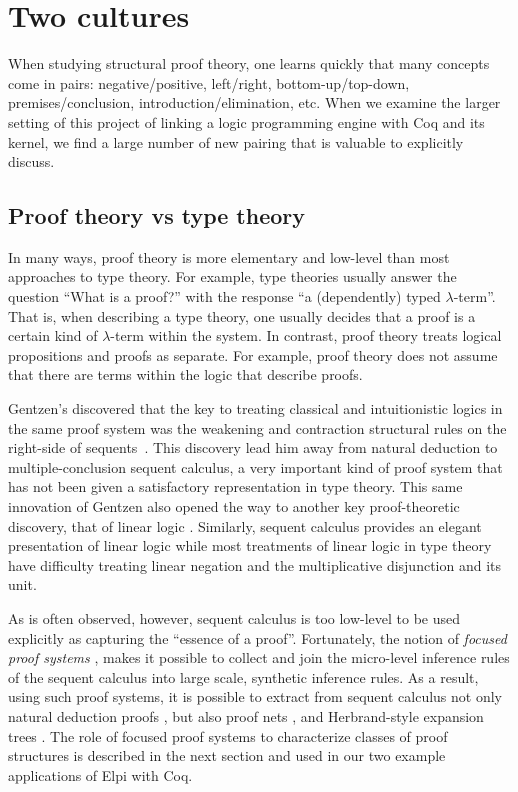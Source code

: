 \section{Two cultures}

When studying structural proof theory, one learns quickly that many
concepts come in pairs: negative/positive, left/right,
bottom-up/top-down, premises/conclusion, introduction/elimination,
etc.  When we examine the larger setting of this project of linking a
logic programming engine with Coq and its kernel, we find a large
number of new pairing that is valuable to explicitly discuss.

\subsection{Proof theory vs type theory}

In many ways, proof theory is more elementary and low-level than most
approaches to type theory.  For example, type theories usually answer
the question ``What is a proof?'' with the response ``a (dependently)
typed $\lambda$-term''.  That is, when describing a type theory, one
usually decides that a proof is a certain kind of $\lambda$-term
within the system.  In contrast, proof theory treats logical
propositions and proofs as separate.  For example, proof theory does
not assume that there are terms within the logic that describe proofs.

Gentzen's discovered that the key to treating classical and
intuitionistic logics in the same proof system was the weakening and
contraction structural rules on the right-side of
sequents~\cite{gentzen35}.  This discovery lead him away from natural
deduction to multiple-conclusion sequent calculus, a very important
kind of proof system that has not been given a satisfactory
representation in type theory.  This same innovation of Gentzen also
opened the way to another key proof-theoretic discovery, that of
linear logic \cite{girard87tcs}.  Similarly, sequent calculus provides
an elegant presentation of linear logic while most treatments of
linear logic in type theory have difficulty treating linear negation
and the multiplicative disjunction  and its unit.

As is often observed, however, sequent calculus is too low-level to be
used explicitly as capturing the ``essence of a proof''.  Fortunately,
the notion of \emph{focused proof systems}
\cite{andreoli92jlc,liang09tcs}, makes it possible to collect and join
the micro-level inference rules of the sequent calculus into large
scale, synthetic inference rules.  As a result, using such proof
systems, it is possible to extract from sequent calculus not only
natural deduction proofs \cite{pimentel16lsfa}, but also proof nets
\cite{chaudhuri08tcs}, and Herbrand-style expansion trees
\cite{chaudhuri16jlc}.  The role of focused proof systems to
characterize classes of proof structures is described in the next
section and used in our two example applications of Elpi with Coq.

